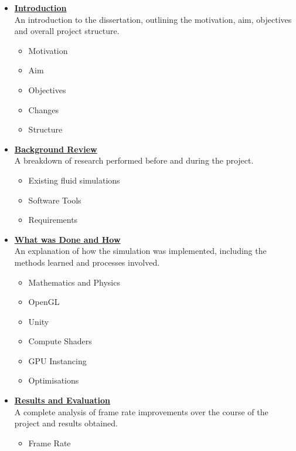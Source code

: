 \documentclass[12pt]{article}
\begin{document}
    \begin{itemize}
        \item \hyperref[sec:introduction]{\textbf{Introduction}} \\
        An introduction to the dissertation, outlining the motivation, aim, objectives and overall project structure. 
        \begin{itemize}
            \item Motivation
            \item Aim
            \item Objectives
            \item Changes
            \item Structure
        \end{itemize}
        \item \hyperref[sec:backgroundreview]{\textbf{Background Review}} \\
        A breakdown of research performed before and during the project.
        \begin{itemize}
            \item Existing fluid simulations
            \item Software Tools
            \item Requirements
        \end{itemize}
        \item \hyperref[sec:whatwasdoneandhow]{\textbf{What was Done and How}} \\
        An explanation of how the simulation was implemented, including the methods learned and processes involved.
        \begin{itemize}
            \item Mathematics and Physics
            \item OpenGL
            \item Unity
            \item Compute Shaders
            \item GPU Instancing
            \item Optimisations
        \end{itemize}
        \item \hyperref[sec:resultsandevaluation]{\textbf{Results and Evaluation}} \\
        A complete analysis of frame rate improvements over the course of the project and results obtained.
        \begin{itemize}
            \item Frame Rate

\end{itemize}
\end{itemize}
\end{document}

